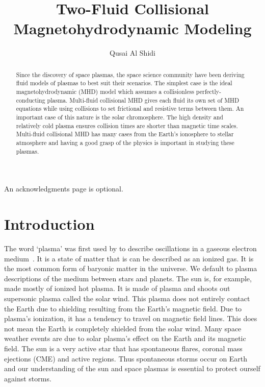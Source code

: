 \documentclass[12pt,upcase]{umlthesis}
\begin{document}
\title{Two-Fluid Collisional Magnetohydrodynamic Modeling}
\author{Qusai Al Shidi}
\maketitle

\begin{abstract}
	Since the discovery of space plasmas, the space science community have been deriving fluid models of plasmas to best suit their scenarios. The simplest case is the ideal magnetohydrodynamic (MHD) model which assumes a collisionless perfectly-conducting plasma. Multi-fluid collisional MHD gives each fluid its own set of MHD equations while using collisions to set frictional and resistive terms between them. An important case of this nature is the solar chromosphere. The high density and relatively cold plasma ensures collision times are shorter than magnetic time scales. Multi-fluid collisional MHD has many cases from the Earth's ionosphere to stellar atmosphere and having a good grasp of the physics is important in studying these plasmas.
\end{abstract}

\begin{acknowledgments}
An acknowledgments page is optional.
\end{acknowledgments}


\tableofcontents
\listoffigures
\listoftables

\chapter{Introduction}

The word `plasma' was first used by \citet{Langmuir1928} to describe oscillations in a gaseous electron medium~\citep{Tonks1967}. It is a state of matter that is can be described as an ionized gas. It is the most common form of baryonic matter in the universe. We default to plasma descriptions of the medium between stars and planets. The sun is, for example, made mostly of ionized hot plasma. It is made of plasma and shoots out supersonic plasma called the solar wind. This plasma does not entirely contact the Earth due to shielding resulting from the Earth's magnetic field. Due to plasma's ionization, it has a tendency to travel on magnetic field lines. This does not mean the Earth is completely shielded from the solar wind. Many space weather events are due to solar plasma's effect on the Earth and its magnetic field. The sun is a very active star that has spontaneous flares, coronal mass ejections (CME) and active regions. Thus spontaneous storms occur on Earth and our understanding of the sun and space plasmas is essential to protect ourself against storms.
\end{document}
